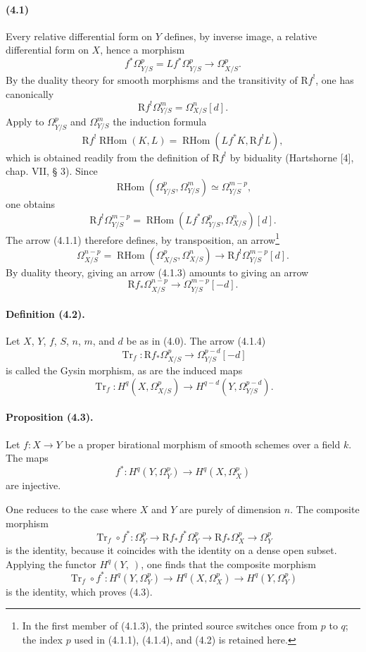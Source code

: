 \documentclass[10pt]{article}
\newcommand{\R}{\mathrm R}
\providecommand{\Tr}{\operatorname{Tr}}
\providecommand{\RHom}{\operatorname{RHom}}
\begin{document}
\paragraph{(4.1)} Every relative differential form on $Y$ defines, by inverse image, a relative differential form on $X$, hence a morphism
\[
\tag{4.1.1}
f^*\Omega_{Y/S}^p=Lf^*\Omega_{Y/S}^p\longrightarrow\Omega_{X/S}^p.
\]
By the duality theory for smooth morphisms and the transitivity of $\R f^!$, one has canonically
\[
\tag{4.1.2}
\R f^!\Omega_{Y/S}^m=\Omega_{X/S}^n[d].
\]
Apply to $\Omega_{Y/S}^p$ and $\Omega_{Y/S}^m$ the induction formula
\[
\R f^!\RHom(K,L)=\RHom(Lf^*K,\R f^!L),
\]
which is obtained readily from the definition of $\R f^!$ by biduality (Hartshorne [4], chap. VII, § 3). Since
\[
\RHom(\Omega_{Y/S}^p,\Omega_{Y/S}^m)\simeq\Omega_{Y/S}^{m-p},
\]
one obtains
\[
\R f^!\Omega_{Y/S}^{m-p}=\RHom(Lf^*\Omega_{Y/S}^p,\Omega_{X/S}^n)[d].
\]
The arrow (4.1.1) therefore defines, by transposition, an arrow\footnote{In the first member of (4.1.3), the printed source switches once from $p$ to $q$; the index $p$ used in (4.1.1), (4.1.4), and (4.2) is retained here.}
\[
\tag{4.1.3}
\Omega_{X/S}^{n-p}=\RHom(\Omega_{X/S}^p,\Omega_{X/S}^n)
\longrightarrow \R f^!\Omega_{Y/S}^{m-p}[d].
\]
By duality theory, giving an arrow (4.1.3) amounts to giving an arrow
\[
\tag{4.1.4}
\R f_*\Omega_{X/S}^{n-p}\longrightarrow\Omega_{Y/S}^{m-p}[-d].
\]

\paragraph{Definition (4.2).} Let $X$, $Y$, $f$, $S$, $n$, $m$, and $d$ be as in (4.0). The arrow (4.1.4)
\[
\Tr_f:\R f_*\Omega_{X/S}^p\longrightarrow\Omega_{Y/S}^{p-d}[-d]
\]
is called the Gysin morphism, as are the induced maps
\[
\Tr_f:H^q(X,\Omega_{X/S}^p)\longrightarrow H^{q-d}(Y,\Omega_{Y/S}^{p-d}).
\]

\paragraph{Proposition (4.3).} Let $f:X\to Y$ be a proper birational morphism of smooth schemes over a field $k$. The maps
\[
f^*:H^q(Y,\Omega_Y^p)\longrightarrow H^q(X,\Omega_X^p)
\]
are injective.

One reduces to the case where $X$ and $Y$ are purely of dimension $n$. The composite morphism
\[
\Tr_f\circ f^*:\Omega_Y^p\longrightarrow\R f_*f^*\Omega_Y^p\longrightarrow\R f_*\Omega_X^p\longrightarrow\Omega_Y^p
\]
is the identity, because it coincides with the identity on a dense open subset. Applying the functor $H^q(Y,\ )$, one finds that the composite morphism
\[
\Tr_f\circ f^*:H^q(Y,\Omega_Y^p)\longrightarrow H^q(X,\Omega_X^p)\longrightarrow H^q(Y,\Omega_Y^p)
\]
is the identity, which proves (4.3).
\end{document}
